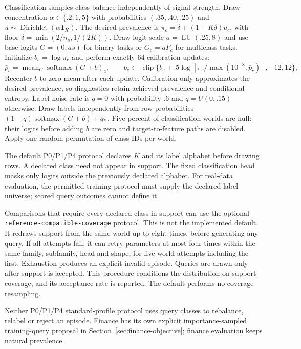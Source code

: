 \documentclass[11pt]{article}
\begin{document}
Classification samples class balance independently of signal strength. Draw concentration $\alpha\in\{.2,1,5\}$ with probabilities $(.35,.40,.25)$ and $u\sim\operatorname{Dirichlet}(\alpha\mathbf1_K)$. The desired prevalence is $\pi_c=\delta+(1-K\delta)u_c$, with floor $\delta=\min(2/n_s,1/(2K))$. Draw logit scale $a=\operatorname{LU}(.25,8)$ and use base logits $G=(0,as)$ for binary tasks or $G_c=aF_c$ for multiclass tasks. Initialize $b_c=\log\pi_c$ and perform exactly 64 calibration updates:
\[
\bar p_c=\operatorname{mean}_{C}\operatorname{softmax}(G+b)_c,
\qquad b_c\leftarrow\operatorname{clip}\{b_c+.5\log[\pi_c/\max(10^{-8},\bar p_c)],-12,12\},
\]
Recenter $b$ to zero mean after each update. Calibration only approximates the desired prevalence, so diagnostics retain achieved prevalence and conditional entropy. Label-noise rate is $q=0$ with probability $.6$ and $q=U(0,.15)$ otherwise. Draw labels independently from row probabilities $(1-q)\operatorname{softmax}(G+b)+q\pi$. Five percent of classification worlds are null: their logits before adding $b$ are zero and target-to-feature paths are disabled. Apply one random permutation of class IDs per world.

The default P0/P1/P4 protocol declares $K$ and its label alphabet before drawing rows. A declared class need not appear in support. The fixed classification head masks only logits outside the previously declared alphabet. For real-data evaluation, the permitted training protocol must supply the declared label universe; scored query outcomes cannot define it.

Comparisons that require every declared class in support can use the optional \texttt{reference-\allowbreak{}compatible-\allowbreak{}coverage} protocol. This is not the implemented default. It redraws support from the same world up to eight times, before generating any query. If all attempts fail, it can retry parameters at most four times within the same family, subfamily, head and shape, for five world attempts including the first. Exhaustion produces an explicit invalid episode. Queries are drawn only after support is accepted. This procedure conditions the distribution on support coverage, and its acceptance rate is reported. The default performs no coverage resampling.

Neither P0/P1/P4 standard-profile protocol uses query classes to rebalance, relabel or reject an episode. Finance has its own explicit importance-sampled training-query proposal in Section~\ref{sec:finance-objective}; finance evaluation keeps natural prevalence.
\end{document}
